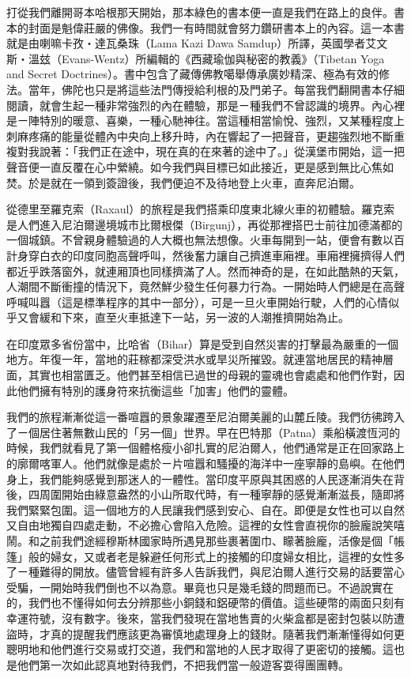 打從我們離開哥本哈根那天開始，那本綠色的書本便一直是我們在路上的良伴。書本的封面是魁偉莊嚴的佛像。我們一有時間就會努力鑽研書本上的內容。這一本書就是由喇嘛卡孜‧達瓦桑珠（Lama
Kazi Dawa
Samdup）所譯，英國學者艾文斯‧溫玆（Evans-Wentz）所編輯的《西藏瑜伽與秘密的教義》（Tibetan
Yoga and Secret
Doctrines）。書中包含了藏傳佛教噶舉傳承廣妙精深、極為有效的修法。當年，佛陀也只是將這些法門傳授給利根的及門弟子。每當我們翻開書本仔細閱讀，就會生起一種非常強烈的內在體驗，那是ㄧ種我們不曾認識的境界。內心裡是ㄧ陣特別的暖意、喜樂，一種心馳神往。當這種相當愉悅、強烈，又某種程度上刺麻疼痛的能量從體內中央向上移升時，內在響起了一把聲音，更趨強烈地不斷重複對我說著：「我們正在途中，現在真的在來著的途中了。」從漢堡市開始，這一把聲音便一直反覆在心中縈繞。如今我們與目標已如此接近，更是感到無比心焦如焚。於是就在一領到簽證後，我們便迫不及待地登上火車，直奔尼泊爾。

從德里至羅克索（Raxaul）的旅程是我們搭乘印度東北線火車的初體驗。羅克索是人們進入尼泊爾邊境城市比爾根傑（Birgunj），再從那裡搭巴士前往加德滿都的一個城鎮。不曾親身體驗過的人大概也無法想像。火車每開到一站，便會有數以百計身穿白衣的印度同胞高聲呼叫，然後奮力讓自己擠進車廂裡。車廂裡擁擠得人們都近乎跌落窗外，就連厢頂也同樣擠滿了人。然而神奇的是，在如此酷熱的天氣，人潮間不斷衝撞的情況下，竟然鮮少發生任何暴力行為。一開始時人們總是在高聲呼喊叫囂（這是標準程序的其中一部分），可是一旦火車開始行駛，人們的心情似乎又會緩和下來，直至火車抵達下一站，另一波的人潮推擠開始為止。

在印度眾多省份當中，比哈省（Bihar）算是受到自然災害的打擊最為嚴重的一個地方。年復一年，當地的莊稼都深受洪水或旱災所摧毀。就連當地居民的精神層面，其實也相當匱乏。他們甚至相信已過世的母親的靈魂也會處處和他們作對，因此他們擁有特別的護身符來抗衡這些「加害」他們的靈體。

我們的旅程漸漸從這一番喧囂的景象躍遷至尼泊爾美麗的山麓丘陵。我們彷彿跨入了ㄧ個居住著無數山民的「另一個」世界。早在巴特那（Patna）乘船橫渡恆河的時候，我們就看見了第一個體格瘦小卻扎實的尼泊爾人，他們通常是正在回家路上的廓爾喀軍人。他們就像是處於ㄧ片喧囂和騷擾的海洋中一座寧靜的島嶼。在他們身上，我們能夠感覺到那迷人的一體性。當印度平原與其困惑的人民逐漸消失在背後，四周圍開始由綠意盎然的小山所取代時，有一種寧靜的感覺漸漸滋長，隨即將我們緊緊包圍。這一個地方的人民讓我們感到安心、自在。即便是女性也可以自然又自由地獨自四處走動，不必擔心會陷入危險。這裡的女性會直視你的臉龐說笑嘻鬧。和之前我們途經穆斯林國家時所遇見那些裹著圍巾、矇著臉龐，活像是個「帳篷」般的婦女，又或者老是躲避任何形式上的接觸的印度婦女相比，這裡的女性多了ㄧ種難得的開放。儘管曾經有許多人告訴我們，與尼泊爾人進行交易的話要當心受騙，一開始時我們倒也不以為意。畢竟也只是幾毛錢的問題而已。不過說實在的，我們也不懂得如何去分辨那些小銅錢和鋁硬幣的價值。這些硬幣的兩面只刻有幸運符號，沒有數字。後來，當我們發現在當地售賣的火柴盒都是密封包裝以防遭盜時，才真的提醒我們應該更為審慎地處理身上的錢財。隨著我們漸漸懂得如何更聰明地和他們進行交易或打交道，我們和當地的人民才取得了更密切的接觸。這也是他們第一次如此認真地對待我們，不把我們當一般遊客耍得團團轉。


